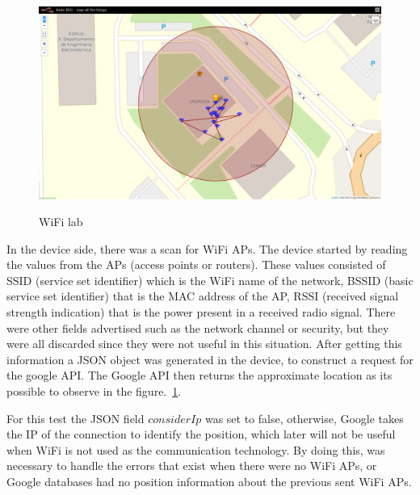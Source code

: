 \begin{figure}[htbp]
  \centering

    {\includegraphics[width=0.6\linewidth]{Chapters/Figures/wifilab.png}}%

  \caption{WiFi lab}
  \label{fig:WiFi_geo}
\end{figure}
In the device side, there was a scan for WiFi APs. The device started by reading the values from the APs (access points or routers). These values consisted of SSID (service set identifier) which is the WiFi name of the network,
BSSID (basic service set identifier) that is the  MAC address of the AP, RSSI (received signal strength indication) that is the power present in a received radio signal. There were other fields advertised such as the network channel or security, but they were all discarded since they were not useful in this situation.
After getting this information a JSON object was generated in the device, to construct a request for the google API.
The Google API then returns the approximate location as its possible to observe in the figure.~\ref{fig:WiFi_geo}.





For this test the JSON field $considerIp$ was set to false, otherwise, Google takes the IP of the connection to identify the position, which later will not be useful when WiFi is not used as the communication technology. By doing this, was necessary to handle the errors that exist when there were no WiFi APs, or Google databases had no position information about the  previous sent WiFi APs.

